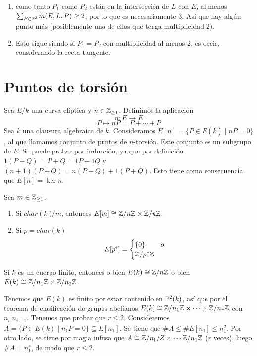 \documentclass[CR.tex]{subfiles}
\begin{document}
\begin{coro}[Korollar 2.3.9]
\begin{enumerate}
\item como tanto $P_1$ como $P_2$ están en la intersección de $L$ con $E$, al menos $\sum_{P\in\mathbb{P}^2}m(E,L,P)\geq 2$, por lo que es necesariamente 3. Así que hay algún punto más (posiblemente uno de ellos que tenga multiplicidad 2). 
\item Esto sigue siendo si $P_1=P_2$ con multiplicidad al menos 2, es decir, considerando la recta tangente. 
\end{enumerate}
\end{coro}


\section{Puntos de torsión}


Sea $E/k$ una curva elíptica y $n\in\mathbb{Z}_{\geq 1}$. Definimos la aplicación
\[
n:E\to E
\]
\[P\mapsto nP=P+\cdots+P\]
Sea $\overline{k}$ una clausura algebraica de $k$. Consideramos $E[n]=\{P\in E(\overline{k})\mid nP=0\}$, al que llamamos conjunto de puntos de $n$-torsión. Este conjunto es un subgrupo de $E$. Se puede probar por inducción, ya que por definición $1(P+Q)=P+Q=1P+1Q$ y $(n+1)(P+Q)=n(P+Q)+1(P+Q)$. Esto tiene como consecuencia que $E[n]=\ker n$. 

\begin{prop}
Sea $m\in\mathbb{Z}_{\geq 1}$. \begin{enumerate}
\item Si $char(k)\not| m$, entonces $E[m]\cong \mathbb{Z}/n\mathbb{Z}\times \mathbb{Z}/n\mathbb{Z}$. 
\item Si $p=char(k)$
\[
E[p^e]=\begin{cases}
\{0\} & o\\
\mathbb{Z}/p^e\mathbb{Z} & 
\end{cases}
\]
\end{enumerate} 
\end{prop}


\begin{prop}
Si $k$ es un cuerpo finito, entonces o bien $E(k)\cong \mathbb{Z}/n\mathbb{Z}$ o bien $E(k)\cong\mathbb{Z}/ n_1\mathbb{Z}\times \mathbb{Z}/n_2\mathbb{Z}$.
\end{prop}
\begin{dem}
Tenemos que $E(k)$ es finito por estar contenido en $\mathbb{P}^2(k)$, así que por el teorema de clasificación de grupos abelianos $E(k)\cong\mathbb{Z}/n_1\mathbb{Z}\times\cdots\times\mathbb{Z}/n_r\mathbb{Z}$ con $n_i|n_{i+1}$. Tenemos que probar que $r\leq 2$. Consideremos $A=\{P\in E(k)\mid n_1P=0\}\subseteq E[n_1]$. Se tiene que $\# A\leq \# E[n_1]\leq n_1^2$. Por otro lado, se tiene por magia infusa que $A\cong\mathbb{Z}/n_1/Z\times\cdots\mathbb{Z}/n_1\mathbb{Z}$ ($r$ veces), luego $\# A=n_1^r$, de modo que $r\leq 2$. 
\end{dem}
\end{document}

